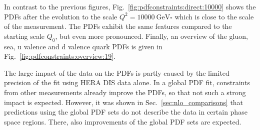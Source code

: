 In contrast to the previous figures, Fig.~\ref{fig:pdfconstraints:direct:10000}
shows the PDFs after the evolution to the scale $Q^2 = \SI{10000}{\GeV \square}$
which is close to the scale of the measurement. The PDFs exhibit the same
features compared to the starting scale $Q_0$, but even more pronounced.
Finally, an overview of the gluon, sea, u valence and d valence quark PDFs is
given in Fig.~\ref{fig:pdfconstraints:overview:19}. 

The large impact of the data on the PDFs is partly caused by the limited
precision of the fit using HERA DIS data alone. In a global PDF fit, constraints
from other measurements already improve the PDFs, so that not such a strong
impact is expected. However, it was shown in Sec.~\ref{sec:nlo_comparisons} that
predictions using the global PDF sets do not describe the data in certain phase
space regions. There, also improvements of the global PDF sets are expected.

